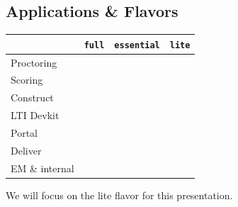 \subsection{\TAOCE Applications \& Flavors}
\newcommand{\flyes}{\alert{\faCheckCircle}}
\begin{frame}
    \begin{center}
        \begin{tabular}{l | c c c}
            & \scriptsize\texttt{full}
            & \scriptsize\texttt{essential}
            & \scriptsize\texttt{lite}
            \\
            \hline
            Proctoring      & \flyes & & \\
            Scoring         & \flyes & & \\
            Construct       & \flyes & \flyes \\
            LTI Devkit      & \flyes & \flyes \\
            Portal          & \flyes & \flyes & \flyes \\
            Deliver         & \flyes & \flyes & \flyes \\
            EM \& internal  & \flyes & \flyes & \flyes \\
        \end{tabular}

        \vspace*{2em}
        We will focus on the \alert{lite} flavor for this presentation.
    \end{center}
\end{frame}
